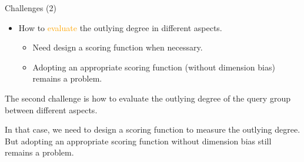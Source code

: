 \documentclass[
 size=14pt,
 paper=smartboard,  %
 mode=present, 		%
 display=slides, 	%
 style=tuliplab,  	%
 pauseslide,
 fleqn,leqno]{powerdot}
\begin{document}
\begin{slide}[toc=,bm=]{Challenges (2)}

\begin{itemize}
\item
How to \textcolor{orange}{evaluate} the outlying degree in different aspects.

\begin{itemize}
\item
Need design a scoring function when necessary.

\item
Adopting an appropriate scoring function (without dimension bias) remains a problem.

\end{itemize}
\end{itemize}

\begin{note}
The second challenge is how to evaluate the outlying degree of
the query group between different aspects.

In that case,
we need to design a scoring function to measure the outlying degree.
But adopting an appropriate scoring function without dimension bias still remains a problem.
\end{note}

\end{slide}
\end{document}

